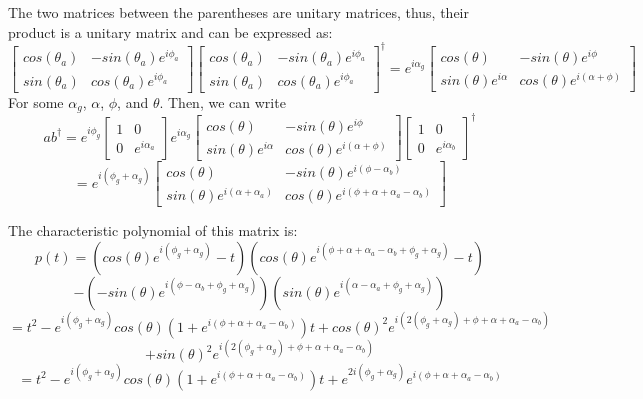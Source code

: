 \documentclass{article}
\begin{document}
The two matrices between the parentheses are unitary matrices, thus, their
product is a unitary matrix and can be expressed as:
$$\begin{bmatrix}cos(\theta_a)&-sin(\theta_a)e^{i\phi_a}\\
  sin(\theta_a)&cos(\theta_a)e^{i\phi_a}\end{bmatrix}\begin{bmatrix}
  cos(\theta_a)&-sin(\theta_a)e^{i\phi_a}\\sin(\theta_a)
  &cos(\theta_a)e^{i\phi_a}\end{bmatrix}^\dagger = 
  e^{i\alpha_g}\begin{bmatrix}cos(\theta)&-sin(\theta)e^{i\phi}\\
  sin(\theta)e^{i\alpha}&cos(\theta)e^{i(\alpha + \phi)}\end{bmatrix}$$
For some $\alpha_g$, $\alpha$, $\phi$, and $\theta$. Then, we can write
$$ab^\dagger = e^{i\phi_g}\begin{bmatrix}1&0\\0&e^{i\alpha_a}\end{bmatrix}
  e^{i\alpha_g}\begin{bmatrix}cos(\theta)&-sin(\theta)e^{i\phi}\\
  sin(\theta)e^{i\alpha}&cos(\theta)e^{i(\alpha + \phi)}\end{bmatrix}
  \begin{bmatrix}1&0\\0&e^{i\alpha_b}\end{bmatrix}^\dagger$$
$$ = e^{i(\phi_g + \alpha_g)}\begin{bmatrix}cos(\theta)&-sin(\theta)
  e^{i(\phi - \alpha_b)}\\sin(\theta)e^{i(\alpha + \alpha_a)}
  &cos(\theta)e^{i(\phi + \alpha + \alpha_a - \alpha_b)}\end{bmatrix}$$

The characteristic polynomial of this matrix is:
$$p(t) = (cos(\theta)e^{i(\phi_g + \alpha_g)} - t)
(cos(\theta)e^{i(\phi + \alpha + \alpha_a - \alpha_b + \phi_g + \alpha_g)} - t)$$
$$- (-sin(\theta)e^{i(\phi - \alpha_b + \phi_g + \alpha_g)})
  (sin(\theta)e^{i(\alpha - \alpha_a + \phi_g + \alpha_g)})$$
$$ = t^2 - e^{i(\phi_g + \alpha_g)}cos(\theta)(1 + e^{i(\phi + \alpha + \alpha_a - \alpha_b)})t 
  + cos(\theta)^2e^{i(2(\phi_g + \alpha_g) + \phi + \alpha + \alpha_a - \alpha_b)} $$
  $$+ sin(\theta)^2e^{i(2(\phi_g + \alpha_g) + \phi + \alpha + \alpha_a - \alpha_b)}$$
$$ = t^2 - e^{i(\phi_g + \alpha_g)}cos(\theta)(1 + e^{i(\phi + \alpha + \alpha_a - \alpha_b)})t + e^{2i(\phi_g + \alpha_g)}e^{i(\phi + \alpha + \alpha_a - \alpha_b)}$$
\end{document}

